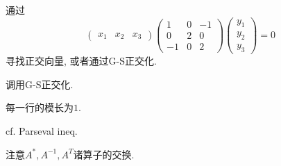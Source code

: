 \documentclass{ctexart}
\begin{document}
\begin{ex}[2]
	通过
	\[ \begin{pmatrix}
		x_1 & x_2 & x_3
	\end{pmatrix}\begin{pmatrix}
		1 & 0 & -1\\
		0 & 2 & 0\\
		-1 & 0 & 2
	\end{pmatrix}\begin{pmatrix}
		y_1\\
		y_2\\
		y_3
	\end{pmatrix} = 0 \]
	寻找正交向量, 或者通过G-S正交化.
\end{ex}
\begin{ex}[5]
	调用G-S正交化.
\end{ex}
\begin{ex}[10]
	每一行的模长为$1$.
\end{ex}
\begin{ex}[17]
	cf. Parseval ineq.
\end{ex}
\begin{ex}[13]
	注意$A^{*}, A^{-1}, A^T$诸算子的交换.
\end{ex}
\end{document}
